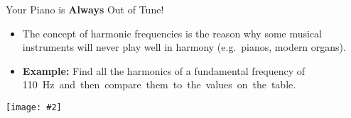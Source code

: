 \documentclass[12pt,aspectratio=169]{beamer}
\newcommand{\pic}[2]{\texttt{[image: \#2]}}
\begin{document}
\begin{frame}{Your Piano is \textbf{Always} Out of Tune!}
  \begin{itemize}
  \item The concept of harmonic frequencies is the reason why some musical
    instruments will never play well in harmony (e.g.\ pianos, modern organs).
  \item \textbf{Example:} Find all the harmonics of a fundamental frequency of
    \SI{110}\hertz and then compare them to the values on the table.
  \end{itemize}
  \begin{center}
    \pic{.6}{fundamental_freqs}
  \end{center}
\end{frame}
\end{document}
